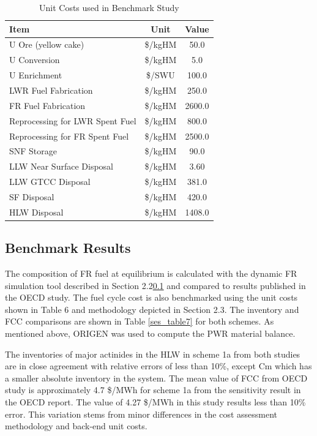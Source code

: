 \begin{table}[htbp]
\begin{center}
\caption{Unit Costs used in Benchmark Study}
\label{ses_table6}
\begin{tabular}{|l|c|c|}
\hline
\textbf{Item}                   & \textbf{Unit} & \textbf{Value} \\
\hline
U Ore (yellow cake)             & \$/kgHM       & 50.0 \\
U Conversion                    & \$/kgHM       & 5.0 \\
U Enrichment                    & \$/SWU        & 100.0 \\
LWR Fuel Fabrication            & \$/kgHM       & 250.0 \\
FR Fuel Fabrication             & \$/kgHM       & 2600.0 \\
Reprocessing for LWR Spent Fuel & \$/kgHM       & 800.0 \\
Reprocessing for FR Spent Fuel  & \$/kgHM       & 2500.0 \\
SNF Storage                     & \$/kgHM       & 90.0 \\
LLW Near Surface Disposal       & \$/kgHM       & 3.60 \\
LLW GTCC Disposal               & \$/kgHM       & 381.0 \\
SF Disposal                     & \$/kgHM       & 420.0 \\
HLW Disposal                    & \$/kgHM       & 1408.0 \\
\hline
\end{tabular}
\end{center}
\end{table}



\subsection{Benchmark Results}
\label{ses_sec:benchmark_results}
The composition of FR fuel at equilibrium is calculated with the
dynamic FR simulation tool described in Section 2.2\ref{} and compared to
results published in the OECD study.  The fuel cycle cost is also
benchmarked using the unit costs shown in Table 6 and methodology
depicted in Section 2.3.  The inventory and FCC comparisons are shown in
Table \ref{ses_table7} for both schemes.  As mentioned above, ORIGEN was used to
compute the PWR material balance.

The inventories of major actinides in the HLW in scheme 1a from both
studies are in close agreement with relative errors of less than 10\%,
except Cm which has a smaller absolute inventory in the system. The mean
value of FCC from OECD study is approximately 4.7 \$/MWh for scheme 1a
from the sensitivity result in the OECD report. The value of 4.27 \$/MWh
in this study results less than 10\% error.  This variation stems from
minor differences in the cost assessment methodology and back-end unit
costs. 


